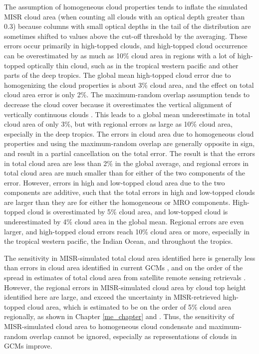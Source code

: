 The assumption of homogeneous cloud properties tends to inflate the simulated MISR cloud area (when counting all clouds with an optical depth greater than 0.3) because columns with small optical depths in the tail of the distribution are sometimes shifted to values above the cut-off threshold by the averaging. These errors occur primarily in high-topped clouds, and high-topped cloud occurrence can be overestimated by as much as 10\% cloud area in regions with a lot of high-topped optically thin cloud, such as in the tropical western pacific and other parts of the deep tropics. The global mean high-topped cloud error due to homogenizing the cloud properties is about 3\% cloud area, and the effect on total cloud area error is only 2\%.  The maximum-random overlap assumption tends to decrease the cloud cover because it overestimates the vertical alignment of vertically continuous clouds \citep{mace_and_benson-troth_2002, hogan_and_illingworth_2000, barker_2008}. This leads to a global mean underestimate in total cloud area of only 3\%, but with regional errors as large as 10\% cloud area, especially in the deep tropics.  The errors in cloud area due to homogeneous cloud properties and using the maximum-random overlap are generally opposite in sign, and result in a partial cancellation on the total error. The result is that the errors in total cloud area are less than 2\% in the global average, and regional errors in total cloud area are much smaller than for either of the two components of the error. However, errors in high and low-topped cloud area due to the two components are additive, such that the total errors in high and low-topped clouds are larger than they are for either the homogeneous or MRO components. High-topped cloud is overestimated by 5\% cloud area, and low-topped cloud is underestimated by 4\% cloud area in the global mean. Regional errors are even larger, and high-topped cloud errors reach 10\% cloud area or more, especially in the tropical western pacific, the Indian Ocean, and throughout the tropics.

The sensitivity in MISR-simulated total cloud area identified here is generally less than errors in cloud area identified in current GCMs \citep{kay_et_al_2012, klein_et_al_2013, bodas-salcedo_et_al_2011}, and on the order of the spread in estimates of total cloud area from satellite remote sensing retrievals \cite{marchand_et_al_2010, pincus_et_al_2012}. However, the regional errors in MISR-simulated cloud area by cloud top height identified here are large, and exceed the uncertainty in MISR-retrieved high-topped cloud area, which is estimated to be on the order of 5\% cloud area regionally, as shown in Chapter \ref{me_chapter} and \cite{hillman_et_al_2016}. Thus, the sensitivity of MISR-simulated cloud area to homogeneous cloud condensate and maximum-random overlap cannot be ignored, especially as representations of clouds in GCMs improve. 

